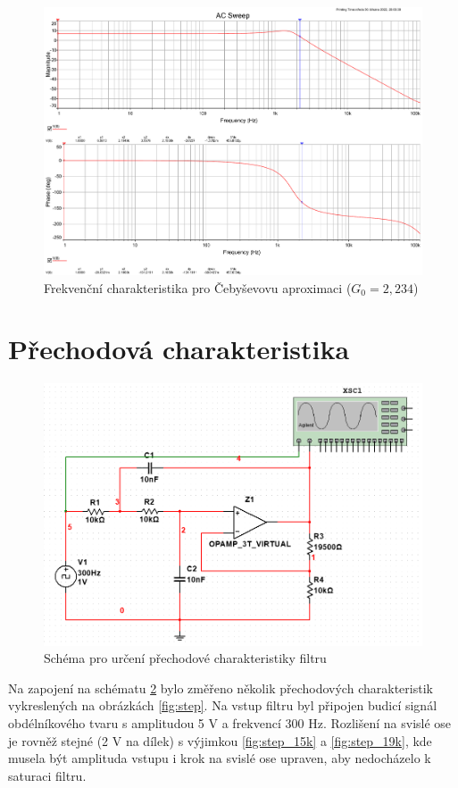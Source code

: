 \documentclass[twoside]{article}
\begin{document}
\begin{figure}[h!]
    \centering
    \includegraphics[width=0.92\linewidth]{bode_cebysev.pdf}
    \caption{Frekvenční charakteristika pro Čebyševovu aproximaci ($G_0 = 2,234$)}
    \label{fig:bode_cebysev}
\end{figure}

\newpage
\section{Přechodová charakteristika}

\begin{figure}[h!]
    \centering
    \includegraphics[width=0.8\linewidth]{step_schema.png}
    \caption{Schéma pro určení přechodové charakteristiky filtru}
    \label{fig:schema_step}
\end{figure}

Na zapojení na schématu \ref{fig:schema_step} bylo změřeno několik přechodových charakteristik
vykreslených na obrázkách \ref{fig:step}. Na vstup filtru byl připojen budicí signál 
obdélníkového tvaru s amplitudou 5 V a frekvencí 300 Hz. Rozlišení na svislé ose je 
rovněž stejné (2 V na dílek) s výjimkou \ref{fig:step_15k} a \ref{fig:step_19k}, kde musela být amplituda
vstupu i krok na svislé ose upraven, aby nedocházelo k saturaci filtru.
\end{document}

